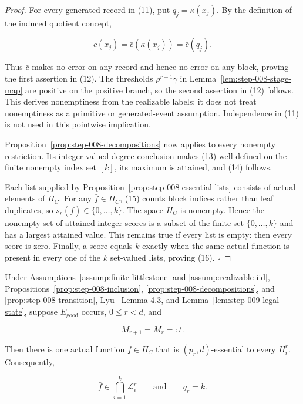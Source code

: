 \begin{proof}
For every generated record in (11), put \(q_j=\kappa(x_j)\). By the
definition of the induced quotient concept,

\[
 c(x_j)=\bar c(\kappa(x_j))=\bar c(q_j).
\]

Thus \(\bar c\) makes no error on any record and hence no error on any
block, proving the first assertion in (12). The thresholds
\(\rho^{r+1}\gamma\) in Lemma~\ref{lem:step-008-stage-map} are positive on
the positive branch, so the second assertion in (12) follows. This derives nonemptiness from the
realizable labels; it does not treat nonemptiness as a primitive or
generated-event assumption. Independence in (11) is not used in this
pointwise implication.

Proposition~\ref{prop:step-008-decompositions} now applies to every nonempty
restriction. Its integer-valued degree conclusion makes (13) well-defined on
the finite nonempty index set \([k]\), its maximum is attained, and (14)
follows.

Each list supplied by Proposition~\ref{prop:step-008-essential-lists}
consists of actual elements of \(H_C\). For any
\(\bar f\in H_C\), (15) counts block indices rather than leaf duplicates,
so \(s_r(\bar f)\in\{0,\ldots,k\}\). The space \(H_C\) is nonempty. Hence
the nonempty set of attained integer scores is a subset of the finite set
\(\{0,\ldots,k\}\) and has a largest attained value. This remains true if
every list is empty: then every score is zero. Finally, a score equals
\(k\) exactly when the same actual function is present in every one of the
\(k\) set-valued lists, proving (16). \(\square\)


\end{proof}

\begin{proposition}\label{prop:step-009-equality-common}
Under Assumptions~\ref{assump:finite-littlestone} and
\ref{assump:realizable-iid}, 
Propositions~\ref{prop:step-008-inclusion},
\ref{prop:step-008-decompositions}, and
\ref{prop:step-008-transition}, Lyu~\citep{lyu2025} Lemma 4.3, and
Lemma~\ref{lem:step-009-legal-state}, suppose \(E_{\mathrm{good}}\) occurs,
\(0\le r<d\), and

\[
 M_{r+1}=M_r=:t.
 \tag{17}
\]

Then there is one actual function \(\bar f\in H_C\) that is
\((p_r,d)\)-essential to every \(H_i^r\). Consequently,

\[
 \bar f\in\bigcap_{i=1}^k\mathcal L_i^r
 \qquad\text{and}\qquad q_r=k.
 \tag{18}
\]


\end{proposition}

